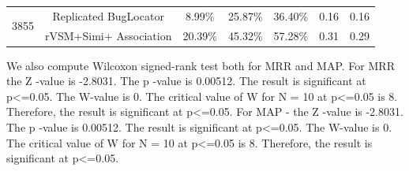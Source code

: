 \documentclass[conference]{IEEEtran}
\begin{document}
\begin{table}[htbp]
{\begin{tabular}{c|c|c|c|c|c|c}
			\multirow{2}{*}{3855}       &Replicated BugLocator     &  8.99\%& 25.87\%&36.40\%& 0.16 & 0.16  \\ \cline{2-7}
			& rVSM+Simi+ Association                                                                                                                       & 20.39\%                                                 & 45.32\%                                                 & 57.28\%                                                  &   0.31  &  0.29    \\ 
			\hline
	\end{tabular}}
	\centering
\end{table}






We also compute Wilcoxon signed-rank test both for MRR and MAP. For MRR the {Z} -value is -2.8031. The {p} -value is 0.00512. The result is significant at p<=0.05. The W-value is 0. The critical value of W for N = 10 at p<=0.05 is 8. Therefore, the result is significant at p<=0.05.
For MAP - the {Z} -value is -2.8031. The {p} -value is 0.00512. The result is significant at p<=0.05. The W-value is 0. The critical value of W for N = 10 at p<=0.05 is 8. Therefore, the result is significant at p<=0.05.
\end{document}
